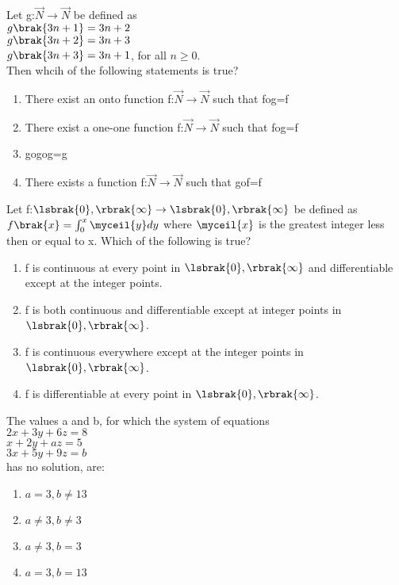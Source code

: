 \item Let g:$\vec{N} \to \vec{N}$ be defined as \\
$g\brak{3n+1}=3n+2$\\
$g\brak{3n+2}=3n+3$\\
$g\brak{3n+3}=3n+1$, for all $n\geq0$.\\
Then whcih of the following statements is true? \hfill{}
\begin{enumerate}
    \item There exist an onto function f:$\vec{N} \to \vec{N}$ such that fog=f
    \item There exist a one-one function f:$\vec{N}\to \vec{N}$ such that fog=f
    \item gogog=g
    \item There exists a function f:$\vec{N} \to \vec{N}$ such that gof=f
\end{enumerate}
\item Let f:$\lsbrak{0},\rbrak{\infty}\to \lsbrak{0},\rbrak{\infty}$ be defined as $f\brak{x}=\int_0^x \myceil{y}dy$ where $\myceil{x}$ is the greatest integer less then or equal to x. Which of the following is true? \hfill{}
\begin{enumerate}
    \item f is continuous at every point in $\lsbrak{0},\rbrak{\infty}$ and differentiable except at the integer points.
    \item f is both continuous and differentiable except at integer points in $\lsbrak{0},\rbrak{\infty}$.
    \item f is continuous everywhere except at the integer points in $\lsbrak{0},\rbrak{\infty}$.
    \item f is differentiable at every point in $\lsbrak{0},\rbrak{\infty}$.
\end{enumerate}
\item The values a and b, for which the system of equations\\ 
$2x+3y+6z=8$\\
$x+2y+az=5$\\
$3x+5y+9z=b$\\
has no solution, are: \hfill{}
\begin{enumerate}
    \item $a=3,b\neq13$
    \item $a\neq3,b\neq3$
    \item $a\neq3,b=3$
    \item $a=3,b=13$
\end{enumerate}


